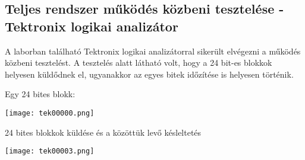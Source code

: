 \subsection{Teljes rendszer működés közbeni tesztelése - Tektronix logikai analizátor}

\tab A laborban található Tektronix logikai analizátorral sikerült elvégezni a működés közbeni tesztelést. A tesztelés alatt látható volt, hogy a 24 bit-es blokkok
helyesen küldődnek el, ugyanakkor az egyes bitek időzítése is helyesen történik.

Egy 24 bites blokk:

\texttt{[image: tek00000.png]}

24 bites blokkok küldése és a közöttük levő késleltetés

\texttt{[image: tek00003.png]}